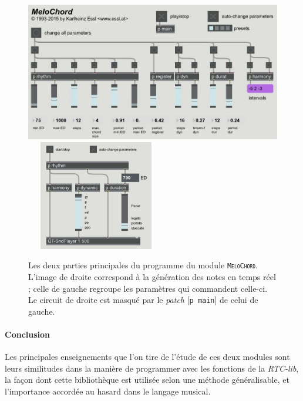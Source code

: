 \documentclass[a4paper,12pt]{article}
\newcommand{\module}[1]{\texttt{\textsc{#1}}}
\newcommand{\patch}[1]{[\texttt{#1}]}
\begin{document}
\begin{figure}[h!]
\begin{center}
\includegraphics[width=12cm]{images/melochord1.jpg}~~~\includegraphics[width=5cm]{images/melochord2.jpg}
\label{melochordmain}
\caption{\footnotesize Les deux parties principales du programme du module \module{MeloChord}. L'image de droite correspond à la génération des notes en temps réel ; celle de gauche regroupe les paramètres qui commandent celle-ci. Le circuit de droite est masqué par le \emph{patch} \patch{p main} de celui de gauche.}
\end{center}
\end{figure}


\paragraph{Conclusion \\}

Les principales enseignements que l'on tire de l'étude de ces deux modules sont leurs similitudes dans la manière de programmer avec les fonctions de la \emph{RTC-lib}, la façon dont cette bibliothèque est utilisée selon une méthode généralisable, et l'importance accordée au hasard dans le langage musical.
\end{document}
